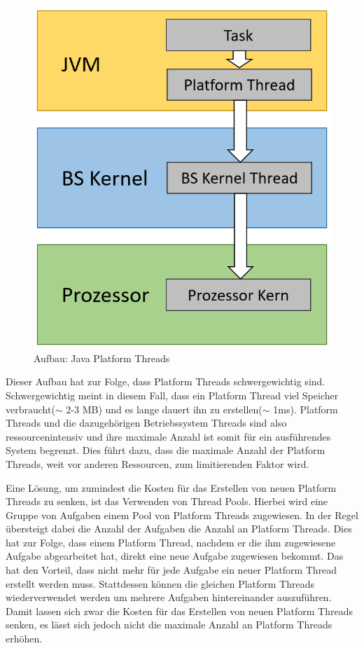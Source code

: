 \documentclass[fontsize=12pt,paper=a4,twoside=semi,parskip=half-,headsepline,headinclude]{scrreprt}
\begin{document}
\begin{figure}[h]
	\centering
	\includegraphics[scale=0.5]{figures/PlatformThreads.png}
	\caption{Aufbau: Java Platform Threads}
	\label{fig:PlatformThreads}
\end{figure}

Dieser Aufbau hat zur Folge, dass Platform Threads schwergewichtig sind. Schwergewichtig meint in diesem Fall, dass ein Platform Thread viel Speicher verbraucht($\sim$ 2-3 MB) und es lange dauert ihn zu erstellen($\sim$ 1ms). Platform Threads und die dazugehörigen Betriebssystem Threads sind also ressourcenintensiv und ihre maximale Anzahl ist somit für ein ausführendes System begrenzt. Dies führt dazu, dass die maximale Anzahl der Platform Threads, weit vor anderen Ressourcen, zum limitierenden Faktor wird. 

Eine Lösung, um zumindest die Kosten für das Erstellen von neuen Platform Threads zu senken, ist das Verwenden von Thread Pools. Hierbei wird eine Gruppe von Aufgaben einem Pool von Platform Threads zugewiesen. In der Regel übersteigt dabei die Anzahl der Aufgaben die Anzahl an Platform Threads. Dies hat zur Folge, dass einem Platform Thread, nachdem er die ihm zugewiesene Aufgabe abgearbeitet hat, direkt eine neue Aufgabe zugewiesen bekommt. Das hat den Vorteil, dass nicht mehr für jede Aufgabe ein neuer Platform Thread erstellt werden muss. Stattdessen können die gleichen Platform Threads wiederverwendet werden um mehrere Aufgaben hintereinander auszuführen. Damit lassen sich zwar die Kosten für das Erstellen von neuen Platform Threads senken, es lässt sich jedoch nicht die maximale Anzahl an Platform Threads erhöhen.
\end{document}
